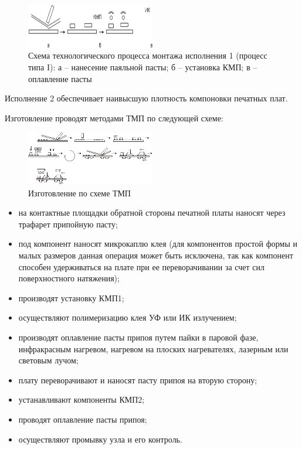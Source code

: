 \documentclass[unicode, 12pt, a4paper, oneside]{article}
\begin{document}
\begin{figure}[htbp]
\centering
\includegraphics[width=0.5\textwidth]{86_scheme.png}
\caption{Схема технологического процесса монтажа исполнения 1 (процесс типа I): а – нанесение паяльной пасты;  б – установка КМП;  в – оплавление пасты}
\label{fig:86_scheme}
\end{figure}

Исполнение 2 обеспечивает  наивысшую плотность компоновки печатных плат.

Изготовление проводят методами ТМП по следующей схеме:

\begin{figure}[htbp]
\centering
\includegraphics[width=0.5\textwidth]{86_scheme2.png}
\caption{Изготовление по схеме ТМП}
\label{fig:86_scheme2}
\end{figure}

\begin{itemize}
\item на контактные площадки обратной стороны печатной платы наносят через трафарет припойную пасту;
\item под компонент наносят микрокаплю клея (для компонентов простой формы и малых размеров данная операция может быть исключена, так как компонент способен удерживаться на плате при ее переворачивании за счет сил поверхностного натяжения);
\item производят установку  КМП1; 
\item осуществляют полимеризацию клея УФ или ИК излучением;
\item производят оплавление пасты припоя путем пайки в паровой фазе, инфракрасным нагревом,  нагревом на плоских нагревателях, лазерным или световым лучом;
\item плату переворачивают и наносят пасту припоя на вторую сторону;
\item устанавливают компоненты КМП2;
\item проводят оплавление пасты припоя;
\item осуществляют промывку узла и его контроль.
\end{itemize}
\end{document}
